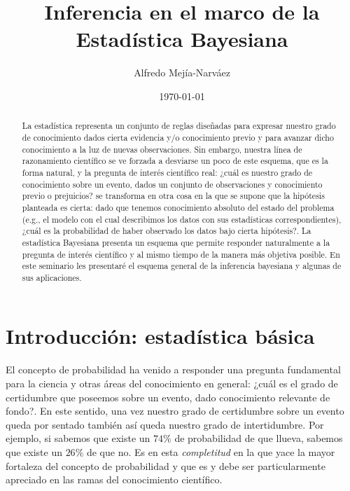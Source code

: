 \documentclass[a4paper,twoside]{article}
\title{Inferencia en el marco de la Estadística Bayesiana}
\author{Alfredo Mejía-Narváez}
\date{\today}
\begin{document}
\maketitle

\begin{abstract}
%
La estadística representa un conjunto de reglas diseñadas para expresar nuestro grado de
conocimiento dados cierta evidencia y/o conocimiento previo y para avanzar dicho conocimiento a la
luz de nuevas observaciones. Sin embargo, nuestra línea de razonamiento científico se ve forzada a
desviarse un poco de este esquema, que es la forma natural, y la pregunta de interés científico
real: ¿cuál es nuestro grado de conocimiento sobre un evento, dados un conjunto de observaciones y
conocimiento previo o prejuicios? se transforma en otra cosa en la que se supone que la hipótesis
planteada es cierta: dado que tenemos conocimiento absoluto del estado del problema (e.g., el modelo
con el cual describimos los datos con sus estadísticas correspondientes), ¿cuál es la probabilidad
de haber observado los datos bajo cierta hipótesis?. La estadística Bayesiana presenta un esquema
que permite responder naturalmente a la pregunta de interés científico y al mismo tiempo de la
manera más objetiva posible. En este seminario les presentaré el esquema general de la inferencia
bayesiana y algunas de sus aplicaciones.
%
\end{abstract}


\section*{Introducción: estadística básica}

El concepto de probabilidad ha venido a responder una pregunta fundamental para la ciencia y otras
áreas del conocimiento en general: ¿cuál es el grado de certidumbre que poseemos sobre un evento,
dado conocimiento relevante de fondo?. En este sentido, una vez nuestro grado de certidumbre sobre
un evento queda por sentado también así queda nuestro grado de intertidumbre. Por ejemplo, si
sabemos que existe un $74\%$ de probabilidad de que llueva, sabemos que existe un $26\%$ de que
no. Es en esta \emph{completitud} en la que yace la mayor fortaleza del concepto de probabilidad y
que es y debe ser particularmente apreciado en las ramas del conocimiento científico.
\end{document}
